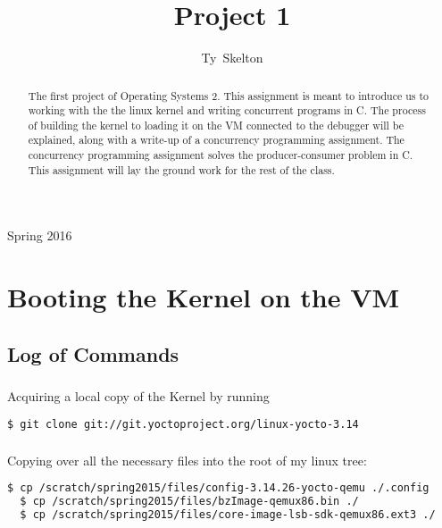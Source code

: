 \documentclass[10pt,draftclsnofoot,onecolumn]{IEEEtran}
\begin{document}
\singlespacing
\title{Project 1}

\author{Ty~Skelton}


%
{Spring 2016}

\maketitle

\begin{abstract}
The first project of Operating Systems 2.
This assignment is meant to introduce us to working with the the linux kernel and writing concurrent programs in C.
The process of building the kernel to loading it on the VM connected to the debugger will be explained, along with a write-up of a concurrency programming assignment.
The concurrency programming assignment solves the producer-consumer problem in C.
This assignment will lay the ground work for the rest of the class. 


\end{abstract}
\IEEEpeerreviewmaketitle

\newpage
{}

\section{Booting the Kernel on the VM}

\subsection{Log of Commands}

\subsubsection{}
Acquiring a local copy of the Kernel by running
\begin{lstlisting}[language=bash]
  $ git clone git://git.yoctoproject.org/linux-yocto-3.14
\end{lstlisting}

\subsubsection{}
Copying over all the necessary files into the root of my linux tree:
\begin{lstlisting}[language=bash]
  $ cp /scratch/spring2015/files/config-3.14.26-yocto-qemu ./.config
  $ cp /scratch/spring2015/files/bzImage-qemux86.bin ./
  $ cp /scratch/spring2015/files/core-image-lsb-sdk-qemux86.ext3 ./
\end{lstlisting}
\end{document}
